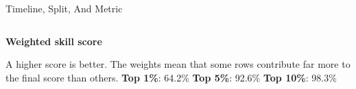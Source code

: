 \begin{frame}[t]{Timeline, Split, And Metric}
\begin{columns}[T,onlytextwidth]
    \begin{whitecard}
      {\bfseries Weighted skill score}\par
      \vspace{0.1em}
      \begin{center}
      \end{center}
      \footnotesize
      A higher score is better. The weights  mean that some rows contribute far more to the final score than others.
      \vspace{0.22em}
      {\scriptsize\textbf{Top 1\%}: 64.2\% \hfill \textbf{Top 5\%}: 92.6\% \hfill \textbf{Top 10\%}: 98.3\%}
    \end{whitecard}
  \end{columns}
\end{frame}
